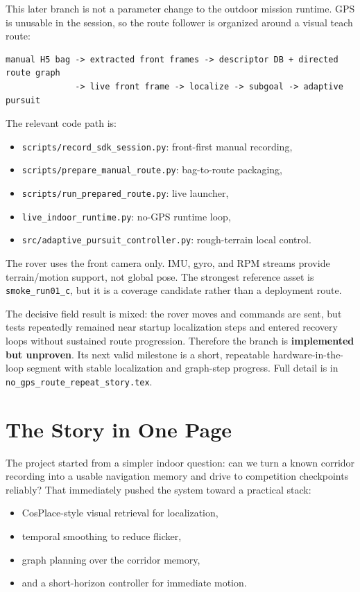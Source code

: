 \documentclass[11pt]{article}
\begin{document}
This later branch is not a parameter change to the outdoor mission runtime. GPS
is unusable in the session, so the route follower is organized around a visual
teach route:

\begin{lstlisting}
manual H5 bag -> extracted front frames -> descriptor DB + directed route graph
              -> live front frame -> localize -> subgoal -> adaptive pursuit
\end{lstlisting}

The relevant code path is:

\begin{itemize}[nosep]
  \item \texttt{scripts/record\_sdk\_session.py}: front-first manual recording,
  \item \texttt{scripts/prepare\_manual\_route.py}: bag-to-route packaging,
  \item \texttt{scripts/run\_prepared\_route.py}: live launcher,
  \item \texttt{live\_indoor\_runtime.py}: no-GPS runtime loop,
  \item \texttt{src/adaptive\_pursuit\_controller.py}: rough-terrain local control.
\end{itemize}

The rover uses the front camera only. IMU, gyro, and RPM streams provide
terrain/motion support, not global pose. The strongest reference asset is
\texttt{smoke\_run01\_c}, but it is a coverage candidate rather than a
deployment route.

The decisive field result is mixed: the rover moves and commands are sent, but
tests repeatedly remained near startup localization steps and entered recovery
loops without sustained route progression. Therefore the branch is
\textbf{implemented but unproven}. Its next valid milestone is a short,
repeatable hardware-in-the-loop segment with stable localization and graph-step
progress. Full detail is in \texttt{no\_gps\_route\_repeat\_story.tex}.

\section{The Story in One Page}

The project started from a simpler indoor question: can we turn a known corridor
recording into a usable navigation memory and drive to competition checkpoints
reliably? That immediately pushed the system toward a practical stack:

\begin{itemize}[nosep]
  \item CosPlace-style visual retrieval for localization,
  \item temporal smoothing to reduce flicker,
  \item graph planning over the corridor memory,
  \item and a short-horizon controller for immediate motion.
\end{itemize}
\end{document}
